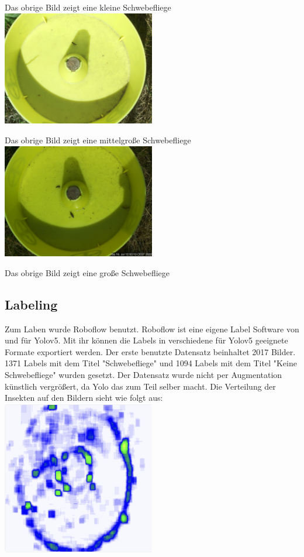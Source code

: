\documentclass[11pt]{scrartcl}
\begin{document}
Das obrige Bild zeigt eine kleine Schwebefliege\\

\includegraphics[width=0.5\textwidth]{diff4111}

Das obrige Bild zeigt eine mittelgroße Schwebefliege\\

\includegraphics[width=0.5\textwidth]{diff4905}

Das obrige Bild zeigt eine große Schwebefliege\\

\subsection{Labeling}

Zum Laben wurde Roboflow benutzt. Roboflow ist eine eigene Label Software von und für Yolov5. Mit ihr können die Labels in verschiedene
für Yolov5 geeignete Formate exportiert werden.
Der erste benutzte Datensatz beinhaltet 2017 Bilder. 1371 Labels mit dem Titel "Schwebefliege" und 1094 Labels mit dem Titel "Keine Schwebefliege"
wurden gesetzt. Der Datensatz wurde nicht per Augmentation künstlich vergrößert, da Yolo das zum Teil selber macht. Die Verteilung der Insekten auf den Bildern sieht wie folgt aus:\\

\includegraphics[width=0.5\textwidth]{verteilung}
\end{document}

